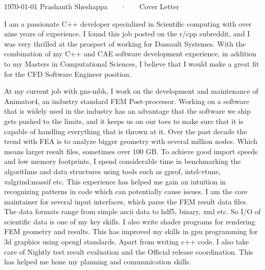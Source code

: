 \documentclass[11pt, a4paper]{awesome-cv}
\newcommand{\company}{Dassault Systemes}
\begin{document}
\makecvheader[R]

\makecvfooter
  {\today}
  {Prashanth Sheshappa ~~~·~~~ Cover Letter}
  {}

\makelettertitle

\begin{cvletter}


I am a passionate C++ developer specialized in Scientific computing with over 
nine years of experience. I found this job posted on the r/cpp subreddit, and I 
was very thrilled at the prospect of working for \company{}.
With the combination of my C++ and CAE software development experience, in 
addition to my Masters in Computational Sciences, I believe that I would make 
a great fit for the CFD Software Engineer position.

At my current job with gns-mbh, I work on the development and maintenance of 
Animator4, an industry standard FEM Post-processor. 
Working on a software that is widely used in the industry has an advantage that 
the software we ship gets pushed to the limits, and it keeps us on our toes to 
make sure that it is capable of handling everything that is thrown at it. 
Over the past decade the trend with FEA is to analyze bigger geometry 
with several million nodes. Which means larger result files, sometimes over 100 
GB. To achieve good import speeds and low memory footprints, I spend 
considerable time in benchmarking the algorithms and data structures using tools
 such as gprof, intel-vtune, valgrind:massif etc.
This experience has helped me gain an intuition in recognizing patterns in code
which can potentially cause issues.   
I am the core maintainer for several input interfaces, which parse the FEM 
result data files. The data formats range from simple ascii data to hdf5, binary, 
xml etc. So I/O of scientific data is one of my key skills. 
I also write shader programs for rendering FEM geometry and results. This has 
improved my skills in gpu programming for 3d graphics using opengl standards.
Apart from writing c++ code, I also take care of Nightly test result evaluation
and the Official release coordination. This has helped me hone my planning and 
communication skills.


\end{cvletter}
\end{document}
